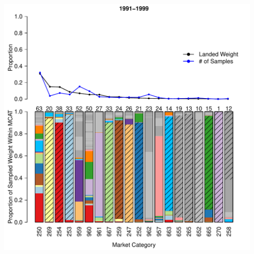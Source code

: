 \documentclass[ xcolor = pdftex, dvipsnames, table ]{beamer}
\begin{document}
%
\begin{frame}
\centering
\includegraphics[height=\textheight]{../pictures/1991to1999Bar3.pdf}

\end{frame}
\end{document}
